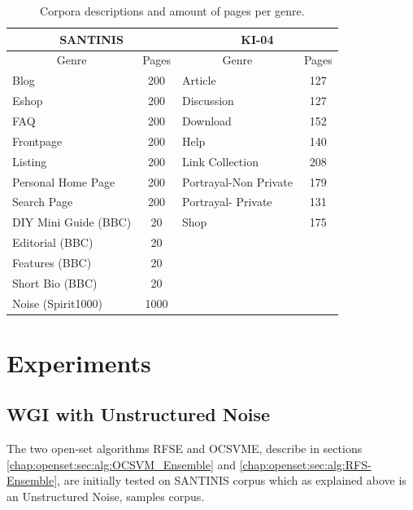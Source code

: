 \begin{table}
\center
\begin{tabular}{|l|l|l|l|}
\hline
\multicolumn{2}{|c|}{SANTINIS} & \multicolumn{2}{c|}{KI-04}\tabularnewline
\hline
\multicolumn{1}{|c|}{Genre} & \multicolumn{1}{c|}{Pages} & \multicolumn{1}{c|}{Genre} & \multicolumn{1}{c|}{Pages}\tabularnewline
\hline
\multicolumn{1}{|l|}{Blog} & \multicolumn{1}{c|}{200} & \multicolumn{1}{l|}{Article} & \multicolumn{1}{c|}{127}\tabularnewline
\multicolumn{1}{|l|}{Eshop} & \multicolumn{1}{c|}{200} & \multicolumn{1}{l|}{Discussion} & \multicolumn{1}{c|}{127}\tabularnewline
\multicolumn{1}{|l|}{FAQ} & \multicolumn{1}{c|}{200} & \multicolumn{1}{l|}{Download} & \multicolumn{1}{c|}{152}\tabularnewline
\multicolumn{1}{|l|}{Frontpage} & \multicolumn{1}{c|}{200} & \multicolumn{1}{l|}{Help} & \multicolumn{1}{c|}{140}\tabularnewline
\multicolumn{1}{|l|}{Listing} & \multicolumn{1}{c|}{200} & \multicolumn{1}{l|}{Link Collection} & \multicolumn{1}{c|}{208}\tabularnewline
\multicolumn{1}{|l|}{Personal Home Page} & \multicolumn{1}{c|}{200} & \multicolumn{1}{l|}{Portrayal-Non Private} & \multicolumn{1}{c|}{179}\tabularnewline
\multicolumn{1}{|l|}{Search Page} & \multicolumn{1}{c|}{200} & \multicolumn{1}{l|}{Portrayal- Private} & \multicolumn{1}{c|}{131}\tabularnewline
\multicolumn{1}{|l|}{DIY Mini Guide (BBC)} & \multicolumn{1}{c|}{20} & \multicolumn{1}{l|}{Shop} & \multicolumn{1}{c|}{175}\tabularnewline
\multicolumn{1}{|l|}{Editorial (BBC)} & \multicolumn{1}{c|}{20} &  & \tabularnewline
\multicolumn{1}{|l|}{Features (BBC)} & \multicolumn{1}{c|}{20} &  & \tabularnewline
\multicolumn{1}{|l|}{Short Bio (BBC)} & \multicolumn{1}{c|}{20} &  & \tabularnewline
\multicolumn{1}{|l|}{Noise (Spirit1000)} & \multicolumn{1}{c|}{1000} &  & \tabularnewline
\hline
\end{tabular}
\caption {Corpora descriptions and amount of pages per genre.}
\label{chap:noise:tbl:genre_tags}
\end{table}


\section{Experiments}\label{chap:noise:sec:Experiments_Results}

\subsection{WGI with Unstructured Noise}\label{chap:noise:sec:WGI_noise}

The two open-set algorithms RFSE and OCSVME, describe in sections \ref{chap:openset:sec:alg:OCSVM_Ensemble} and \ref{chap:openset:sec:alg:RFS-Ensemble}, are initially tested on SANTINIS corpus which as explained above is an Unstructured Noise, samples corpus.   

